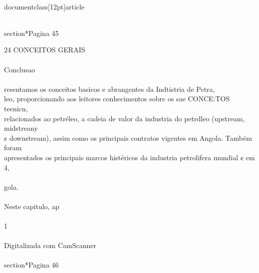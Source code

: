 \\documentclass[12pt]{article}
\begin{document}
\\section*{Pagina 45}

24 CONCEITOS GERAIS\\
\\
Conclusao\\
\\
resentamos os conceitos basicos e abrangentes da Indtistria de Petra,\\
leo, proporcionando aos leitores conhecimentos sobre os sae CONCE:TOS teenicn,\\
relacionados ao petréleo, a cadeia de valor da industria do petrdleo (upstream, midstreany\\
¢ downstream), assim como os principais contratos vigentes em Angola. Também foram\\
apresentados os principais marcos histéricos da industria petrolifera mundial ¢ em 4,\\
\\
gola.\\
\\
Neste capitulo, ap\\
\\
1\\
\\
Digitalizada com CamScanner\\

\\section*{Pagina 46}
\end{document}
